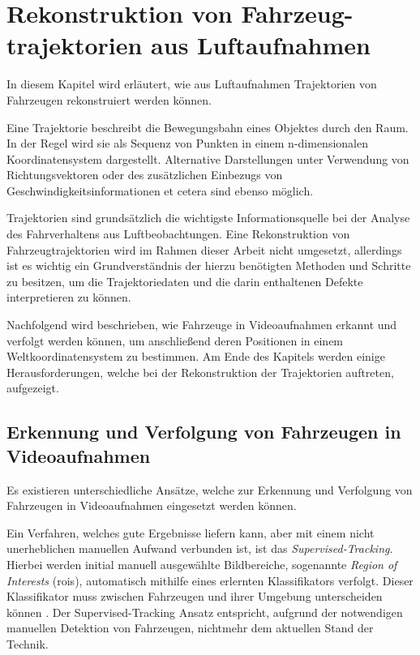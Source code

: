 
\chapter[Rekonstruktion von Fahrzeugtrajektorien aus Luftaufnahmen]
        {Rekonstruktion von Fahrzeug-\\\hspace{1em}trajektorien aus Luftaufnahmen}
\label{sec:position_extraction}

In diesem Kapitel wird erläutert, wie aus Luftaufnahmen Trajektorien von Fahrzeugen rekonstruiert werden können.

\begin{theorem}[Trajektorie]
    Eine Trajektorie beschreibt die Bewegungsbahn eines Objektes durch den Raum.
    In der Regel wird sie als Sequenz von Punkten in einem n-dimensionalen Koordinatensystem dargestellt.
    Alternative Darstellungen unter Verwendung von Richtungsvektoren oder des zusätzlichen
    Einbezugs von Geschwindigkeitsinformationen et cetera sind ebenso möglich.
\end{theorem}

Trajektorien sind grundsätzlich die wichtigste Informationsquelle bei der Analyse des Fahrverhaltens aus Luftbeobachtungen.
Eine Rekonstruktion von Fahrzeugtrajektorien wird im Rahmen dieser Arbeit nicht umgesetzt,
allerdings ist es wichtig ein Grundverständnis der hierzu benötigten Methoden und Schritte zu besitzen,
um die Trajektoriedaten und die darin enthaltenen Defekte interpretieren zu können.

Nachfolgend wird beschrieben, wie Fahrzeuge in Videoaufnahmen erkannt und verfolgt
werden können, um anschließend deren Positionen in einem Weltkoordinatensystem zu bestimmen. Am Ende des Kapitels
werden einige Herausforderungen, welche bei der Rekonstruktion der Trajektorien auftreten, aufgezeigt.

\section{Erkennung und Verfolgung von Fahrzeugen in Videoaufnahmen}

Es existieren unterschiedliche Ansätze, welche zur Erkennung und Verfolgung von Fahrzeugen in Videoaufnahmen
eingesetzt werden können.

Ein Verfahren, welches gute Ergebnisse liefern kann, aber mit einem nicht unerheblichen manuellen Aufwand verbunden ist,
ist das \textit{Supervised-Tracking}. Hierbei werden initial manuell ausgewählte Bildbereiche, sogenannte
\textit{Region of Interests} (\acrshort*{roi}s), automatisch mithilfe eines erlernten Klassifikators verfolgt.
Dieser Klassifikator muss zwischen Fahrzeugen und ihrer Umgebung unterscheiden können \cite[]{Grabner}.
Der Supervised-Tracking Ansatz entspricht, aufgrund der notwendigen manuellen Detektion von Fahrzeugen, nichtmehr
dem aktuellen Stand der Technik.


